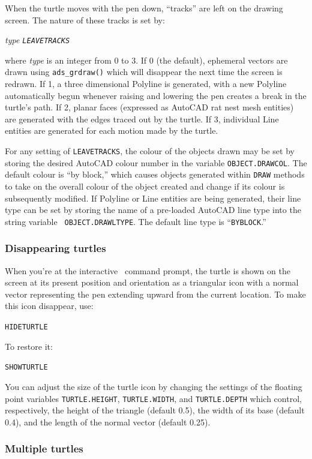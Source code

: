 \documentclass{article}
\begin{document}
When the turtle moves with the pen down, ``tracks'' are left on the
drawing screen.  The nature of these tracks is set by:

{\em type {\tt LEAVETRACKS}}

where {\em type} is an integer from 0 to 3.  If 0 (the default),
ephemeral vectors are drawn using \verb+ads_grdraw()+ which will
disappear the next time the screen is redrawn.  If 1, a three
dimensional Polyline is generated, with a new Polyline automatically
begun whenever raising and lowering the pen creates a break in the
turtle's path.  If 2, planar faces (expressed as AutoCAD rat nest mesh
entities) are generated with the edges traced out by the turtle.  If
3, individual Line entities are generated for each motion made by the
turtle.

For any setting of {\tt LEAVETRACKS}, the colour of the
objects drawn may be set by storing the desired AutoCAD colour number
in the variable {\tt OBJECT.DRAWCOL}\@.  The default colour is ``by
block,'' which causes objects generated within {\tt DRAW} methods to
take on the overall colour of the object created and change if its
colour is subsequently modified.  If Polyline or Line entities are
being generated, their line type can be set by storing the name of a
pre-loaded AutoCAD line type into the string variable {\tt
OBJECT.DRAWLTYPE}\@.  The default line type is ``{\tt BYBLOCK}.''

\subsubsection{Disappearing turtles}

When you're at the interactive \atlas\ command prompt, the turtle is
shown on the screen at its present position and orientation as a
triangular icon with a normal vector representing the pen extending
upward from the current location.  To make this icon disappear, use:

{\tt HIDETURTLE}

To restore it:

{\tt SHOWTURTLE}

You can adjust the size of the turtle icon by changing the
settings of the floating point variables {\tt TURTLE.HEIGHT},
{\tt TURTLE.WIDTH}, and {\tt TURTLE.DEPTH} which control,
respectively,
the height of the triangle (default 0.5), the width of its base (default
0.4), and the length of the normal vector (default 0.25).

\subsubsection{Multiple turtles}
\end{document}
